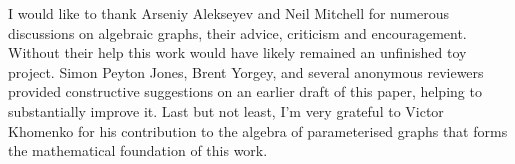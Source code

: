 \documentclass[sigplan]{acmart}\settopmatter{}
\begin{document}








\begin{acks}                            %
  I would like to thank Arseniy Alekseyev and Neil Mitchell
  for numerous discussions on algebraic graphs, their advice,
  criticism and encouragement. Without their help this work would
  have likely remained an unfinished toy project.
  Simon Peyton Jones, Brent Yorgey, and several anonymous reviewers
  provided constructive suggestions on an earlier draft of this paper,
  helping to substantially improve it. Last but not least, I'm very
  grateful to Victor Khomenko for his contribution to the algebra of
  parameterised graphs that forms the mathematical foundation of this work.

\end{acks}




\end{document}
